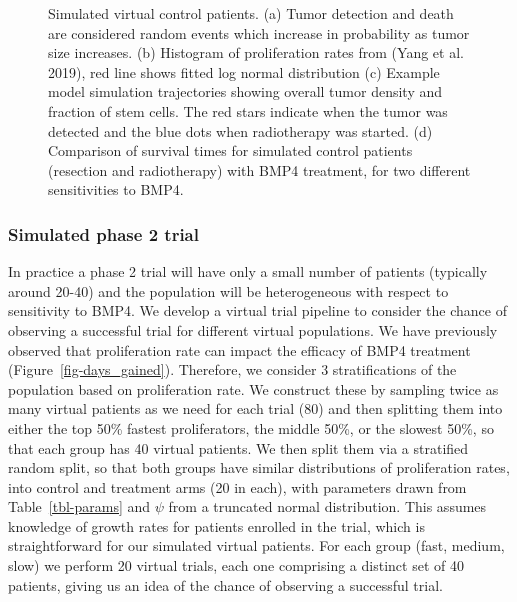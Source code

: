 \documentclass[
  default,
]{sn-jnl}
\begin{document}
\begin{figure}
\begin{minipage}{0.50\linewidth}
{}

\subcaption{\label{fig-simulated_control_KM}}

\end{minipage}%

\caption{\label{fig-simulated-controls}Simulated virtual control
patients. (a) Tumor detection and death are considered random events
which increase in probability as tumor size increases. (b) Histogram of
proliferation rates from (Yang et al. 2019), red line shows fitted log
normal distribution (c) Example model simulation trajectories showing
overall tumor density and fraction of stem cells. The red stars indicate
when the tumor was detected and the blue dots when radiotherapy was
started. (d) Comparison of survival times for simulated control patients
(resection and radiotherapy) with BMP4 treatment, for two different
sensitivities to BMP4.}

\end{figure}%

\subsubsection{Simulated phase 2 trial}\label{sec-phase-2-trial}

In practice a phase 2 trial will have only a small number of patients
(typically around 20-40) and the population will be heterogeneous with
respect to sensitivity to BMP4. We develop a virtual trial pipeline to
consider the chance of observing a successful trial for different
virtual populations. We have previously observed that proliferation rate
can impact the efficacy of BMP4 treatment
(Figure~\ref{fig-days_gained}). Therefore, we consider 3 stratifications
of the population based on proliferation rate. We construct these by
sampling twice as many virtual patients as we need for each trial (80)
and then splitting them into either the top 50\% fastest proliferators,
the middle 50\%, or the slowest 50\%, so that each group has 40 virtual
patients. We then split them via a stratified random split, so that both
groups have similar distributions of proliferation rates, into control
and treatment arms (20 in each), with parameters drawn from
Table~\ref{tbl-params} and \(\psi\) from a truncated normal
distribution. This assumes knowledge of growth rates for patients
enrolled in the trial, which is straightforward for our simulated
virtual patients. For each group (fast, medium, slow) we perform 20
virtual trials, each one comprising a distinct set of 40 patients,
giving us an idea of the chance of observing a successful trial.
\end{document}
